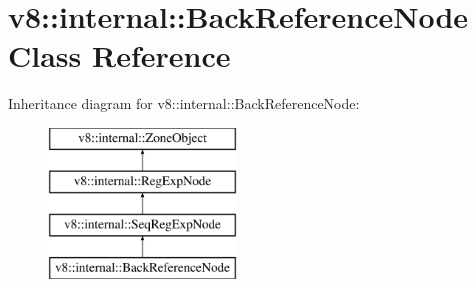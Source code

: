 \hypertarget{classv8_1_1internal_1_1_back_reference_node}{}\section{v8\+:\+:internal\+:\+:Back\+Reference\+Node Class Reference}
\label{classv8_1_1internal_1_1_back_reference_node}
Inheritance diagram for v8\+:\+:internal\+:\+:Back\+Reference\+Node\+:\begin{figure}[H]
\begin{center}
\leavevmode
\includegraphics[height=4.000000cm]{classv8_1_1internal_1_1_back_reference_node}
\end{center}
\end{figure}
